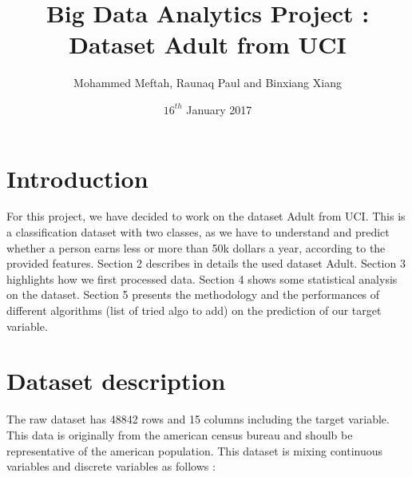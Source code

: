 \documentclass[12pt]{article}
\title{Big Data Analytics Project : Dataset Adult from UCI }
\author{Mohammed Meftah, Raunaq Paul and Binxiang Xiang}
\date{$16^{th}$ January 2017}
\begin{document}
\maketitle
\tableofcontents

\newpage
\section{Introduction}
For this project, we have decided to work on the dataset Adult from UCI. This is a classification dataset with two classes, as we have to understand and predict whether a person earns less or more than 50k dollars a year, according to the provided features. Section 2 describes in details the used dataset Adult. Section 3 highlights how we first processed data. Section 4 shows some statistical analysis on the dataset. Section 5 presents the methodology and the performances of different algorithms (list of tried algo to add) on the prediction of our target variable. 

\section{Dataset description}
The raw dataset has 48842 rows and 15 columns including the target variable. This data is originally from the american census bureau and shoulb be representative of the american population. This dataset is mixing continuous variables and discrete variables as follows : 
\end{document}

